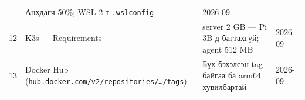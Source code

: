 \begin{longtable}[]{@{}llll@{}}
\begin{minipage}[t]{0.22\columnwidth}
\end{minipage} & \begin{minipage}[t]{0.22\columnwidth}\raggedright
Анхдагч 50\%; WSL 2-т \texttt{.wslconfig}\strut
\end{minipage} & \begin{minipage}[t]{0.22\columnwidth}\raggedright
2026-09\strut
\end{minipage}\tabularnewline
\begin{minipage}[t]{0.22\columnwidth}\raggedright
12\strut
\end{minipage} & \begin{minipage}[t]{0.22\columnwidth}\raggedright
\href{https://docs.k3s.io/installation/requirements}{K3s --- Requirements}\strut
\end{minipage} & \begin{minipage}[t]{0.22\columnwidth}\raggedright
server 2 GB --- Pi 3B-д багтахгүй; agent 512 MB\strut
\end{minipage} & \begin{minipage}[t]{0.22\columnwidth}\raggedright
2026-09\strut
\end{minipage}\tabularnewline
\begin{minipage}[t]{0.22\columnwidth}\raggedright
13\strut
\end{minipage} & \begin{minipage}[t]{0.22\columnwidth}\raggedright
Docker Hub (\texttt{hub.\allowbreak{}docker.\allowbreak{}com/\allowbreak{}v2/\allowbreak{}repositories/\allowbreak{}\ldots{}/\allowbreak{}tags})\strut
\end{minipage} & \begin{minipage}[t]{0.22\columnwidth}\raggedright
Бүх бэхэлсэн tag байгаа ба arm64 хувилбартай\strut
\end{minipage} & \begin{minipage}[t]{0.22\columnwidth}\raggedright
2026-09\strut
\end{minipage}\tabularnewline
\bottomrule
\end{longtable}\endgroup
